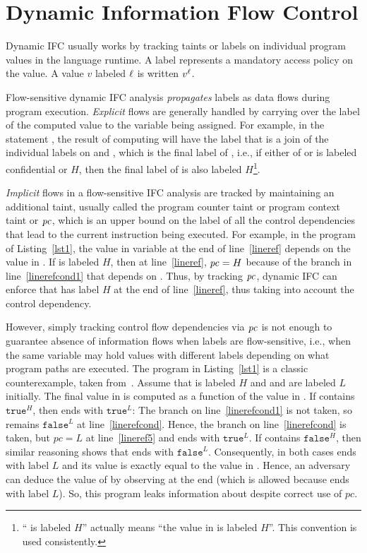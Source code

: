 \section{Dynamic Information Flow Control}
\label{ch:bg-difc}
Dynamic IFC usually works by tracking taints or labels on individual
program values in the language runtime. A label represents a mandatory
access policy on the value. 
A value $v$ labeled $\ell$ is written $v^\ell$. 

Flow-sensitive dynamic IFC analysis \emph{propagates} labels as data
flows during program execution. \emph{Explicit} flows are generally
handled by carrying over the label of the computed value to the
variable being assigned. For example, in the statement ,
the result of computing  will have the label that is a join of
the individual labels on  and , which is the final label
of , i.e., if either of  or  is labeled confidential
or $H$, then the final label of  is also labeled
$H$\footnote{`` is labeled $H$'' actually means ``the 
  value in  is labeled $H$''. This convention is used
  consistently.}. 

\emph{Implicit} flows in a flow-sensitive IFC analysis are tracked by
maintaining an additional taint, usually called the program counter
taint or program context taint or $\mathit{pc}$, which is an upper bound on
the label of all the control dependencies that lead to the current
instruction being executed. For example, in the program of
Listing~\ref{lst1}, the value in variable  at the end of
line~\ref{lineref} depends on the value in . If  is labeled $H$,
then at line~\ref{lineref}, $\mathit{pc} = H$ because of the branch in 
line~\ref{linerefcond1} that depends on . Thus, by tracking $\mathit{pc}$,
dynamic IFC can enforce that  has label $H$ at the end of
line~\ref{lineref}, thus taking into account the control dependency.

However, simply tracking control flow dependencies via $\mathit{pc}$ is not
enough to guarantee absence of information flows when labels are
flow-sensitive, i.e., when the same variable may hold values with
different labels depending on what program paths are executed. The
program in Listing~\ref{lst1} is a classic counterexample, taken
from~\cite{plas09}. Assume that  is labeled $H$ and  and  are
labeled $L$ initially. The final value in  is computed as a function
of the value in . If  contains $\texttt{true}^H$, then  ends
with $\texttt{true}^L$: The branch on line~\ref{linerefcond1} is not
taken, so  remains $\texttt{false}^L$ at
line~\ref{linerefcond}. Hence, the branch on line~\ref{linerefcond} is
taken, but $pc = L$ at line~\ref{lineref5} and  ends with
$\texttt{true}^L$. If  contains $\texttt{false}^H$, then similar
reasoning shows that  ends with $\texttt{false}^L$. Consequently,
in both cases  ends with label $L$ and its value is exactly equal
to the value in . Hence, an adversary can deduce the value of 
by observing  at the end (which is allowed because  ends with
label $L$). So, this program leaks information about  despite
correct use of $pc$.

